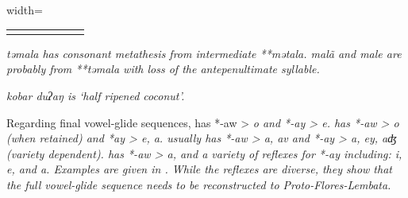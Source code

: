 \begin{table}
\begin{adjustbox}{width=\textwidth}
\begin{threeparttable}
\begin{tabular}{lllllll}
		\lspbottomrule
	\end{tabular}
		\begin{tablenotes}\tnsize
			\item[†]	{ \it{təmala} has consonant metathesis from intermediate **mətala.
								 \it{malã} and  \it{male} are probably from **təmala
								with loss of the antepenultimate syllable.}
			\item[‡]	{ \it{kobar duʔaŋ} is ‘half ripened coconut’.}
		\end{tablenotes}
	\end{threeparttable}
\end{adjustbox}
\end{table}

Regarding final vowel-glide sequences,
 has *-aw > \it{o}
and *-ay > \it{e}.
 has *-aw > \it{o} (when retained)
and *ay > \it{e, a}.
 usually has *-aw > \it{a,
av} and *-ay > \it{a,
ey, aʤ} (variety dependent).
 has *-aw > \it{a},
and a variety of reflexes for *-ay including: \it{i, e,} and \it{a}.
Examples are given in .
While the reflexes are diverse,
they show that the full vowel-glide sequence
needs to be reconstructed to Proto-Flores-Lembata.

